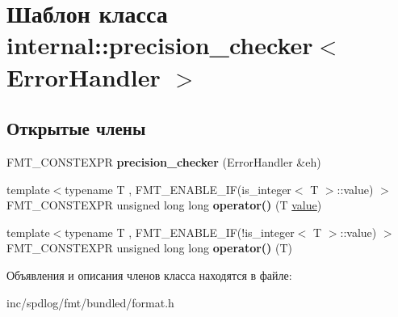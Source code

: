 \hypertarget{classinternal_1_1precision__checker}{}\section{Шаблон класса internal\+:\+:precision\+\_\+checker$<$ Error\+Handler $>$}
\label{classinternal_1_1precision__checker}
\subsection*{Открытые члены}
\begin{DoxyCompactItemize}
\item 
\mbox{\label{classinternal_1_1precision__checker_ab6e241aa1616650ab931c017e0d43438}} 
F\+M\+T\+\_\+\+C\+O\+N\+S\+T\+E\+X\+PR {\bfseries precision\+\_\+checker} (Error\+Handler \&eh)
\item 
\mbox{\label{classinternal_1_1precision__checker_a5dc2f53d0f9a0c33c7d8289415b9d30e}} 
{\footnotesize template$<$typename T , F\+M\+T\+\_\+\+E\+N\+A\+B\+L\+E\+\_\+\+I\+F(is\+\_\+integer$<$ T $>$\+::value) $>$ }\\F\+M\+T\+\_\+\+C\+O\+N\+S\+T\+E\+X\+PR unsigned long long {\bfseries operator()} (T \hyperlink{classinternal_1_1value}{value})
\item 
\mbox{\label{classinternal_1_1precision__checker_a227b3545507a5a3b7a21a293e3eeaf8d}} 
{\footnotesize template$<$typename T , F\+M\+T\+\_\+\+E\+N\+A\+B\+L\+E\+\_\+\+I\+F(!is\+\_\+integer$<$ T $>$\+::value) $>$ }\\F\+M\+T\+\_\+\+C\+O\+N\+S\+T\+E\+X\+PR unsigned long long {\bfseries operator()} (T)
\end{DoxyCompactItemize}


Объявления и описания членов класса находятся в файле\+:\begin{DoxyCompactItemize}
\item 
inc/spdlog/fmt/bundled/format.\+h\end{DoxyCompactItemize}
